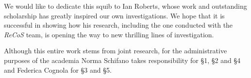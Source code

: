 \documentclass[output=paper]{langsci/langscibook}
\begin{document}
We would like to dedicate this squib to Ian Roberts, whose work and outstanding
scholarship has greatly inspired our own investigations. We hope that it is
successful in showing how his research, including the one conducted with the
\emph{ReCoS} team, is opening the way to new thrilling lines of investigation.

Although this entire work stems from joint research, for the administrative
purposes of the  academia Norma Schifano takes responsibility for §1,
§2 and §4 and Federica Cognola for §3 and §5.

\nocite{IlNovellino,Monumenti}
\printbibliography[heading=subbibliography, title={Sources},
keyword={23-source}]

{\sloppy
\printbibliography[heading=subbibliography,notkeyword=this,notkeyword=23-source]
}
\end{document}
